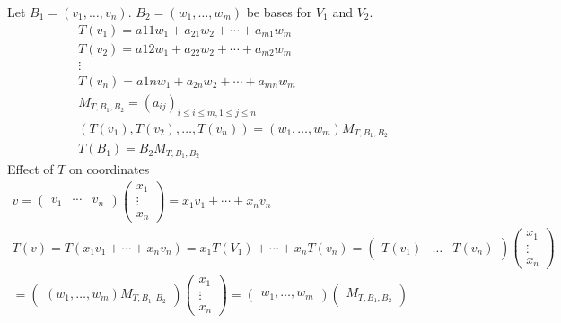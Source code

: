 \documentclass[class=scrartcl, crop=false]{standalone}
\begin{document}
\begin{enumerate}
  \ii
  Let $B_1 = (v_1, \dots, v_n)$. $B_2 = (w_1, \dots, w_m)$ be bases for $V_1$ and $V_2$.
  \begin{gather*}
    T(v_1) = a{11}w_1 + a_{21}w_2 + \cdots + a_{m1}w_m \\
    T(v_2) = a{12}w_1 + a_{22}w_2 + \cdots + a_{m2}w_m \\
    \vdots \\
    T(v_n) = a{1n}w_1 + a_{2n}w_2 + \cdots + a_{mn}w_m \\
    M_{T, B_1, B_2} = (a_{ij})_{i \leq i \leq m, 1 \leq j \leq n} \\
    (T(v_1), T(v_2), \dots, T(v_n)) = (w_1, \dots, w_m) M_{T, B_1, B_2} \\
    T(B_1) = B_2 M_{T, B_1, B_2}
  \end{gather*} 
  \ii
  Effect of $T$ on coordinates
  \begin{gather*}
    v = 
    \begin{pmatrix}
      v_1 & \cdots & v_n
    \end{pmatrix} 
    \begin{pmatrix}
      x_1 \\
      \vdots \\
      x_n
    \end{pmatrix} = x_1v_1 + \cdots + x_nv_n \\
    T(v) = T(x_1v_1 + \cdots + x_nv_n) = x_1T(V_1) + \cdots + x_nT(v_n) =
    \begin{pmatrix}
      T(v_1) & \dots & T(v_n)
    \end{pmatrix} 
    \begin{pmatrix}
      x_1 \\
      \vdots \\
      x_n
    \end{pmatrix} \\ =
    \begin{pmatrix}
      (w_1, \dots, w_m) M_{T, B_1, B_2}
    \end{pmatrix} 
    \begin{pmatrix}
      x_1 \\
      \vdots \\
      x_n
    \end{pmatrix} =
    \begin{pmatrix}
      w_1, \dots, w_m
    \end{pmatrix} 
    \begin{pmatrix}
      M_{T, B_1, B_2}
    \end{pmatrix} 

\end{gather*}
\end{enumerate}
\end{document}
